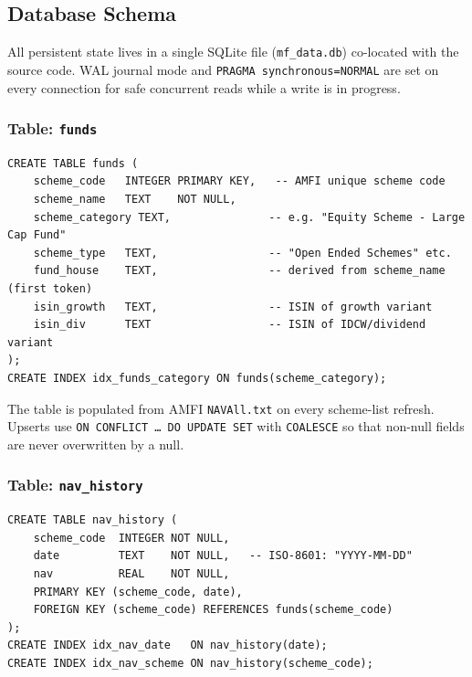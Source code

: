 \documentclass[12pt, a4paper]{article}
\begin{document}
\subsection{Database Schema}

All persistent state lives in a single SQLite file (\texttt{mf\_data.db})
co-located with the source code.  WAL journal mode and \texttt{PRAGMA
synchronous=NORMAL} are set on every connection for safe concurrent reads while
a write is in progress.

\subsubsection{Table: \texttt{funds}}

\begin{lstlisting}[style=sqlcode,caption={funds — scheme master}]
CREATE TABLE funds (
    scheme_code   INTEGER PRIMARY KEY,   -- AMFI unique scheme code
    scheme_name   TEXT    NOT NULL,
    scheme_category TEXT,               -- e.g. "Equity Scheme - Large Cap Fund"
    scheme_type   TEXT,                 -- "Open Ended Schemes" etc.
    fund_house    TEXT,                 -- derived from scheme_name (first token)
    isin_growth   TEXT,                 -- ISIN of growth variant
    isin_div      TEXT                  -- ISIN of IDCW/dividend variant
);
CREATE INDEX idx_funds_category ON funds(scheme_category);
\end{lstlisting}

The table is populated from AMFI \texttt{NAVAll.txt} on every scheme-list
refresh.  Upserts use \texttt{ON CONFLICT … DO UPDATE SET} with
\texttt{COALESCE} so that non-null fields are never overwritten by a null.

\subsubsection{Table: \texttt{nav\_history}}

\begin{lstlisting}[style=sqlcode,caption={nav\_history — daily NAV time series}]
CREATE TABLE nav_history (
    scheme_code  INTEGER NOT NULL,
    date         TEXT    NOT NULL,   -- ISO-8601: "YYYY-MM-DD"
    nav          REAL    NOT NULL,
    PRIMARY KEY (scheme_code, date),
    FOREIGN KEY (scheme_code) REFERENCES funds(scheme_code)
);
CREATE INDEX idx_nav_date   ON nav_history(date);
CREATE INDEX idx_nav_scheme ON nav_history(scheme_code);
\end{lstlisting}
\end{document}
